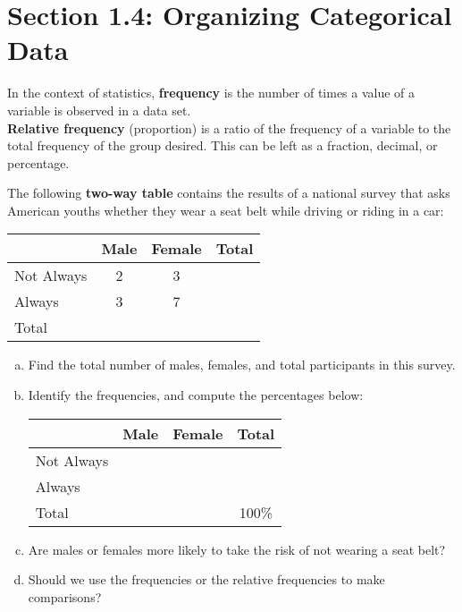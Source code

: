 \documentclass[../mathNotesPreamble]{subfiles}
\begin{document}
  \section{Section 1.4: Organizing Categorical Data}
    \begin{defn*}
      In the context of statistics, \textbf{frequency} is the number of times a value of a variable is observed in a data set.\\
\textbf{Relative frequency} (proportion) is a ratio of the frequency of a variable to the total frequency of the group desired. This can be left as a fraction, decimal, or percentage.
    \end{defn*}

    \begin{ex*}
      The following \textbf{two-way table} contains the results of a national survey that asks American youths whether they wear a seat belt while driving or riding in a car:
    \end{ex*}
    \begin{center}
      \begin{tabular}{@{}l*{3}{c}@{}}\toprule
        & Male & Female & Total\\\midrule
        Not Always& 2& 3& \\
        Always& 3& 7& \\\midrule
        Total\\\bottomrule
      \end{tabular}
    \end{center}
    \begin{enumerate}[a)]
      \item Find the total number of males, females, and total participants in this survey.
      \item Identify the frequencies, and compute the percentages below:
        \begin{center}
          \hspace*{-30pt}
          \begin{tabular}{@{}l*{3}{c}@{}}\toprule
            & Male & Female & Total\\\midrule
            Not Always& & & \\
            Always& & & \\\midrule
            Total&&&100\%\\\bottomrule
          \end{tabular}
        \end{center}
      \item Are males or females more likely to take the risk of not wearing a seat belt?\\[\stretch{1}]
      \item Should we use the frequencies or the relative frequencies to make comparisons?
    \end{enumerate}

  \pagebreak
\end{document}
